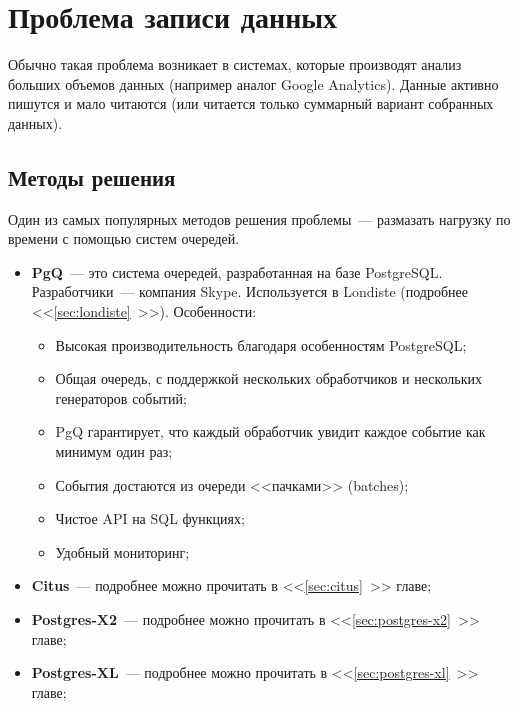 \section{Проблема записи данных}

Обычно такая проблема возникает в системах, которые производят анализ больших объемов данных (например аналог Google Analytics). Данные активно пишутся и мало читаются (или читается только суммарный вариант собранных данных).

\subsection{Методы решения}

Один из самых популярных методов решения проблемы~--- размазать нагрузку по времени с помощью систем очередей.

\begin{itemize}
  \item \textbf{PgQ}~--- это система очередей, разработанная на базе PostgreSQL. Разработчики~--- компания Skype. Используется в Londiste (подробнее <<\ref{sec:londiste}~>>). Особенности:

  \begin{itemize}
    \item Высокая производительность благодаря особенностям PostgreSQL;
    \item Общая очередь, с поддержкой нескольких обработчиков и нескольких генераторов событий;
    \item PgQ гарантирует, что каждый обработчик увидит каждое событие как минимум один раз;
    \item События достаются из очереди <<пачками>> (batches);
    \item Чистое API на SQL функциях;
    \item Удобный мониторинг;
  \end{itemize}

  \item \textbf{Citus}~--- подробнее можно прочитать в <<\ref{sec:citus}~>> главе;
  \item \textbf{Postgres-X2}~--- подробнее можно прочитать в <<\ref{sec:postgres-x2}~>> главе;
  \item \textbf{Postgres-XL}~--- подробнее можно прочитать в <<\ref{sec:postgres-xl}~>> главе;
\end{itemize}
